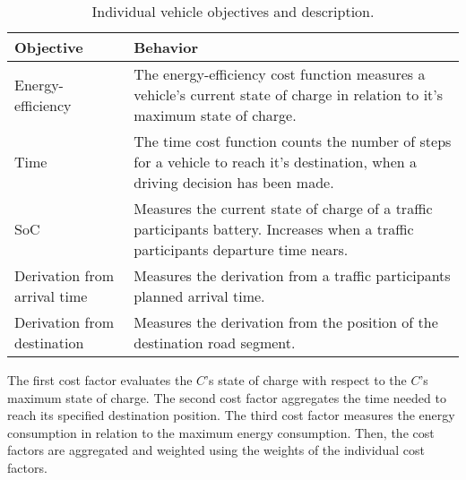 \begin{table}[h!]
	\centering
	\renewcommand{\arraystretch}{1.3}
	\begin{tabularx}{\columnwidth}{|Y|Y|}
		\hline
		
		\textbf{Objective} & \textbf{Behavior} \\
		
		\hline
		
		Energy-efficiency &
		The energy-efficiency cost function measures a vehicle's current state of charge in relation to it's maximum state of charge. \\
		
		\hline
		
		Time &
		The time cost function counts the number of steps for a vehicle to reach it's destination, when a driving decision has been made. \\
		
		\hline
		
		SoC &
		Measures the current state of charge of a traffic participants battery. Increases when a traffic participants departure time nears. \\
		
		\hline
		
		Derivation from arrival time &
		Measures the derivation from a traffic participants planned arrival time. \\
		
		\hline
		
		Derivation from destination &
		Measures the derivation from the position of the destination road segment. \\
		
		\hline			
	\end{tabularx}
	\caption{Individual vehicle objectives and description.}
	\label{figure:objectives}
\end{table}

The first cost factor evaluates the $C$'s state of charge with respect to the $C$'s maximum state of charge. The second cost factor aggregates the time needed to reach its specified destination position. The third cost factor measures the energy consumption in relation to the maximum energy consumption. Then, the cost factors are aggregated and weighted using the weights of the individual cost factors.
